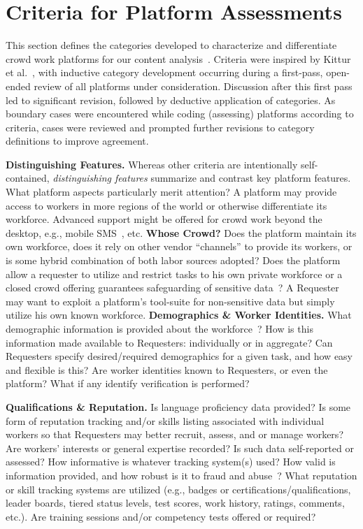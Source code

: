 \documentclass{sigchi}
\begin{document}
\section{Criteria for Platform Assessments}
\label{sec:criteria}


This section defines the categories developed to characterize and differentiate crowd work platforms for our content analysis~\cite{mayring2000qualitative}. Criteria were inspired by Kittur et al.~\cite{Kittur13}, with inductive category development occurring during a first-pass, open-ended review of all platforms under consideration. Discussion after this first pass led to significant revision, followed by deductive application of categories. As boundary cases were encountered while coding (assessing) platforms according to criteria, cases were reviewed and prompted further revisions to category definitions to improve agreement.




{\bf Distinguishing Features.} Whereas other criteria are intentionally self-contained, {\em distinguishing features} summarize and contrast key platform features. What platform aspects particularly merit attention? 
A platform may provide access to workers in more regions of the world or otherwise differentiate its workforce. Advanced support might be offered for crowd work beyond the desktop, e.g., mobile SMS~\cite{eagle2009txteagle}, etc. 
{\bf Whose Crowd?} Does the platform maintain its own workforce, does it rely on other vendor ``channels'' to provide its workers, or is some hybrid combination of both labor sources adopted? 
Does the platform allow a requester to utilize and restrict tasks to his own private workforce or a closed crowd offering guarantees safeguarding of sensitive data~\cite{Nallapati13}?  
A Requester may want to exploit a platform's tool-suite for non-sensitive data but simply utilize his own known workforce. 
{\bf Demographics \& Worker Identities.} What demographic information is provided about the workforce~\cite{Ross10,ipeirotis2010demographics}?  How is this information made available to Requesters: individually or in aggregate?  Can Requesters specify desired/required demographics for a given task, and how easy and flexible is this? Are worker identities known to Requesters, or even the platform? What if any identify verification is performed? 


{\bf Qualifications \& Reputation.} Is language proficiency data provided?  Is some form of reputation tracking and/or skills listing associated with individual workers so that Requesters may better recruit, assess, and or manage workers? Are workers' interests or general expertise recorded? Is such data self-reported or assessed? How informative is whatever tracking system(s) used? How valid is information provided, and how robust is it to fraud and abuse~\cite{ipeirotis-be-a-top-worker}? 
What reputation or skill tracking systems are utilized (e.g., badges or certifications/qualifications, leader boards, tiered status levels, test scores, work history, ratings, comments, etc.). Are training sessions and/or competency tests offered or required?
\end{document}
